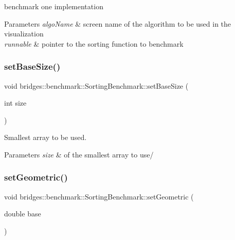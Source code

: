benchmark one implementation 


\begin{DoxyParams}{Parameters}
{\em algo\+Name} & screen name of the algorithm to be used in the visualization \\
\hline
{\em runnable} & pointer to the sorting function to benchmark \\
\hline
\end{DoxyParams}
\mbox{\label{classbridges_1_1benchmark_1_1_sorting_benchmark_afe0474d148c185ed1e479ff11f42ae51}} 
\subsubsection{\texorpdfstring{set\+Base\+Size()}{setBaseSize()}}
{\footnotesize\ttfamily void bridges\+::benchmark\+::\+Sorting\+Benchmark\+::set\+Base\+Size (\begin{DoxyParamCaption}\item[{int}]{size }\end{DoxyParamCaption})\hspace{0.3cm}{\ttfamily [inline]}}



Smallest array to be used. 


\begin{DoxyParams}{Parameters}
{\em size} & of the smallest array to use/ \\
\hline
\end{DoxyParams}
\mbox{\label{classbridges_1_1benchmark_1_1_sorting_benchmark_ade76a5749b07d35b02623cce27c046ab}} 
\subsubsection{\texorpdfstring{set\+Geometric()}{setGeometric()}}
{\footnotesize\ttfamily void bridges\+::benchmark\+::\+Sorting\+Benchmark\+::set\+Geometric (\begin{DoxyParamCaption}\item[{double}]{base }\end{DoxyParamCaption})\hspace{0.3cm}{\ttfamily [inline]}}



